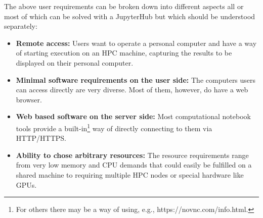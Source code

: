 The above user requirements can be broken down into different aspects all or most of which can be solved with a JupyterHub but which should be understood separately:
\begin{itemize}
  \item \textbf{Remote access:}  Users want to operate a personal computer and have a way of starting execution on an HPC machine, capturing the results to be displayed on their personal computer.
  \item \textbf{Minimal software requirements on the user side:}  The computers users can access directly are very diverse.  Most of them, however, do have a web browser.
  \item \textbf{Web based software on the server side:}  Most computational notebook tools provide a built-in\footnote{For others there may be a way of using, e.g., https://novnc.com/info.html.} way of directly connecting to them via HTTP/HTTPS.
  \item \textbf{Ability to chose arbitrary resources:}  The resource requirements range from very low memory and CPU demands that could easily be fulfilled on a shared machine to requiring multiple HPC nodes or special hardware like GPUs.
\end{itemize}

